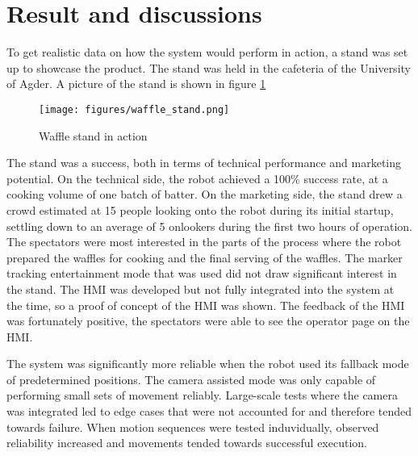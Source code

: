 
\section{Result and discussions}
To get realistic data on how the system would perform in action, a stand was set up to showcase the product. The stand was held in the cafeteria of the University of Agder. A picture of the stand is shown in figure \ref{fig:bestExample}


\begin{figure}[h]
    \centering
    \texttt{[image: figures/waffle\_stand.png]}
    \caption{Waffle stand in action}
    \label{fig:bestExample}
\end{figure}
The stand was a success, both in terms of technical performance and marketing potential. On the technical side, the robot achieved a 100\% success rate, at a cooking volume of one batch of batter. On the marketing side, the stand drew a crowd estimated at 15 people looking onto the robot during its initial startup, settling down to an average of 5 onlookers during the first two hours of operation. The spectators were most interested in the parts of the process where the robot prepared the waffles for cooking and the final serving of the waffles. The marker tracking entertainment mode that was used did not draw significant interest in the stand. The HMI was developed but not fully integrated into the system at the time, so a proof of concept of the HMI was shown. The feedback of the HMI was fortunately positive, the spectators were able to see the operator page on the HMI.

The system was significantly more reliable when the robot used its fallback mode of predetermined positions. The camera assisted mode was only capable of performing small sets of movement reliably. Large-scale tests where the camera was integrated led to edge cases that were not accounted for and therefore tended towards failure. When motion sequences were tested induvidually, observed reliability increased and movements tended towards successful execution. 


